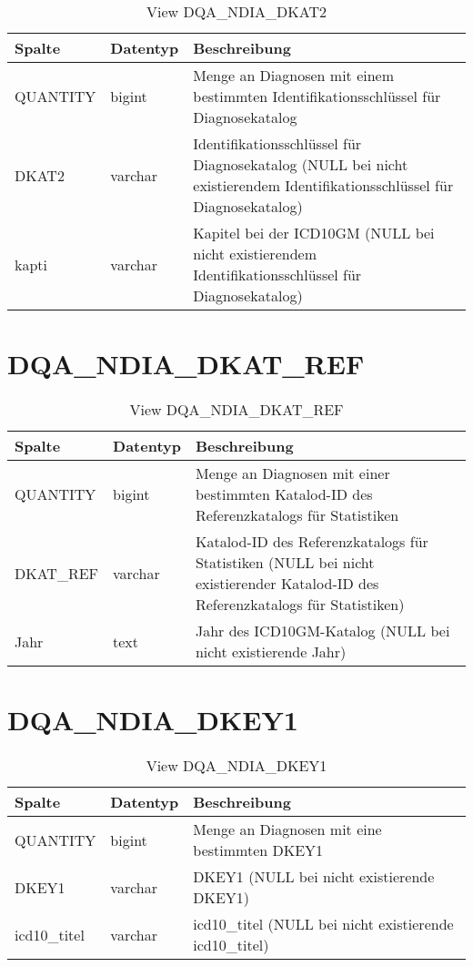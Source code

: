   \begin{table}[ht]
    \centering
    \caption{View DQA\_NDIA\_DKAT2}
    \label{tab:dqandiadkat2}
    \begin{tabular}{||l|l|p{10cm}||}
      \hline
      Spalte & Datentyp & Beschreibung \\ [0.5ex] \hline \hline
QUANTITY & bigint & Menge an Diagnosen mit einem bestimmten Identifikationsschlüssel für Diagnosekatalog \\ \hline
DKAT2 & varchar & Identifikationsschlüssel für Diagnosekatalog (NULL bei nicht existierendem Identifikationsschlüssel für Diagnosekatalog)\\ \hline
kapti & varchar & Kapitel bei der ICD10GM (NULL bei nicht existierendem Identifikationsschlüssel für Diagnosekatalog)\\ \hline
    \end{tabular}
  \end{table}
 \clearpage
  \section{DQA\_NDIA\_DKAT\_REF}

  \begin{table}[ht]
    \centering
    \caption{View DQA\_NDIA\_DKAT\_REF}
    \label{tab:dqandiadkatref}
    \begin{tabular}{||l|l|p{10cm}||}
      \hline
      Spalte & Datentyp & Beschreibung \\ [0.5ex] \hline \hline
QUANTITY & bigint & Menge an Diagnosen mit einer bestimmten Katalod-ID des Referenzkatalogs für Statistiken \\ \hline
DKAT\_REF & varchar & Katalod-ID des Referenzkatalogs für Statistiken (NULL bei nicht existierender Katalod-ID des Referenzkatalogs für Statistiken)\\ \hline
Jahr & text & Jahr des ICD10GM-Katalog (NULL bei nicht existierende Jahr)\\ \hline
    \end{tabular}
  \end{table}
 \clearpage
  \section{DQA\_NDIA\_DKEY1}

  \begin{table}[ht]
    \centering
    \caption{View DQA\_NDIA\_DKEY1}
    \label{tab:dqandiadkey1}
    \begin{tabular}{||l|l|p{10cm}||}
      \hline
      Spalte & Datentyp & Beschreibung \\ [0.5ex] \hline \hline
QUANTITY & bigint & Menge an Diagnosen mit eine bestimmten DKEY1 \\ \hline
DKEY1 & varchar & DKEY1 (NULL bei nicht existierende DKEY1)\\ \hline
icd10\_titel & varchar & icd10\_titel (NULL bei nicht existierende icd10\_titel)\\ \hline
    \end{tabular}
  \end{table}
 \clearpage
